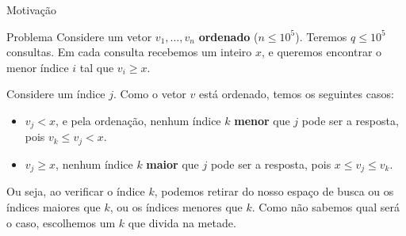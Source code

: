 \begin{frame}{Motivação}

    \begin{block}{Problema}
        Considere um vetor $v_1, \dots, v_n$ {\bf ordenado} ($n \leq 10^5$). Teremos $q \leq  10^5$ consultas. Em cada consulta recebemos um inteiro $x$, e queremos encontrar o menor índice $i$ tal que $v_i \geq x$.
    \end{block} \pause

    Considere um índice $j$. Como o vetor $v$ está ordenado, temos os seguintes casos: \pause
    \begin{itemize}
        \item $v_j < x$, e pela ordenação, nenhum índice $k$ {\bf menor} que $j$ pode ser a resposta, pois $v_k \leq v_j < x$. \pause
        
        \item $v_j \geq x$, nenhum índice $k$ {\bf maior} que $j$ pode ser a resposta, pois $x \leq v_j \leq v_k$.
    \end{itemize} \pause
    Ou seja, ao verificar o índice $k$, podemos retirar do nosso espaço de busca ou os índices maiores que $k$, ou os índices menores que $k$. Como não sabemos qual será o caso, escolhemos um $k$ que divida na metade.
\end{frame}

